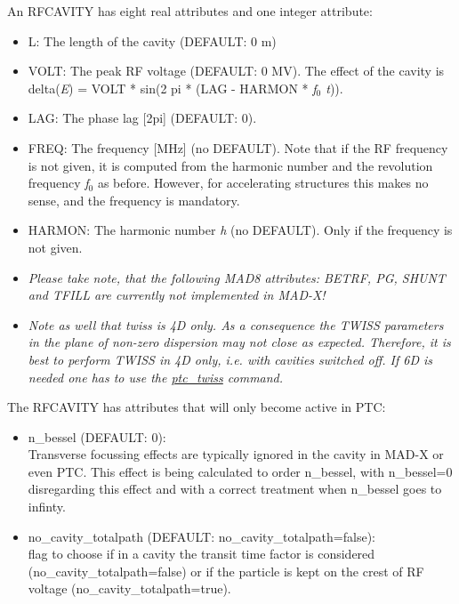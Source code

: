 An RFCAVITY has eight real attributes and one integer attribute: 
\begin{itemize}
   \item L: The length of the cavity (DEFAULT: 0 m) 
   \item VOLT: The peak RF voltage (DEFAULT: 0 MV). The effect of the cavity is \\
     delta(\textit{E}) = VOLT * sin(2 pi * (LAG - HARMON * \textit{f$_0$ t})). 
   \item LAG: The phase lag [2pi] (DEFAULT: 0). 
   \item FREQ: The frequency [MHz] (no DEFAULT). Note that if the RF
     frequency is not given, it is computed from the harmonic number and
     the revolution frequency \textit{f$_0$} as before. However, for
     accelerating structures this makes no sense, and the frequency is
     mandatory.  
   \item HARMON: The harmonic number \textit{h} (no DEFAULT). Only if
     the frequency is not given.  
   \item \textit{ Please take note, that the following MAD8 attributes:
     BETRF, PG, SHUNT and TFILL are currently not implemented in MAD-X!}    

   \item \textit{ Note as well that twiss is 4D only. As a consequence
     the TWISS parameters in the plane of non-zero dispersion may not
     close as expected. Therefore, it is best to perform TWISS in 4D
     only, i.e. with cavities switched off. If 6D is needed one has to
     use the \href{../ptc_twiss/ptc_twiss.html}{ptc\_twiss} command. } 
\end{itemize}  

The RFCAVITY has attributes that will only become active in PTC: 
\begin{itemize}
   \item n\_bessel (DEFAULT: 0): \\
     Transverse focussing effects are typically ignored in the cavity in
     MAD-X or even PTC. This effect is being calculated to order n\_bessel,
     with n\_bessel=0 disregarding this effect and with a correct treatment
     when n\_bessel goes to infinty.
   \item no\_cavity\_totalpath (DEFAULT: no\_cavity\_totalpath=false): \\
     flag to choose if in a cavity the transit time factor is considered
     (no\_cavity\_totalpath=false) or if the particle is kept on the
     crest of RF voltage (no\_cavity\_totalpath=true).  
\end{itemize}  

